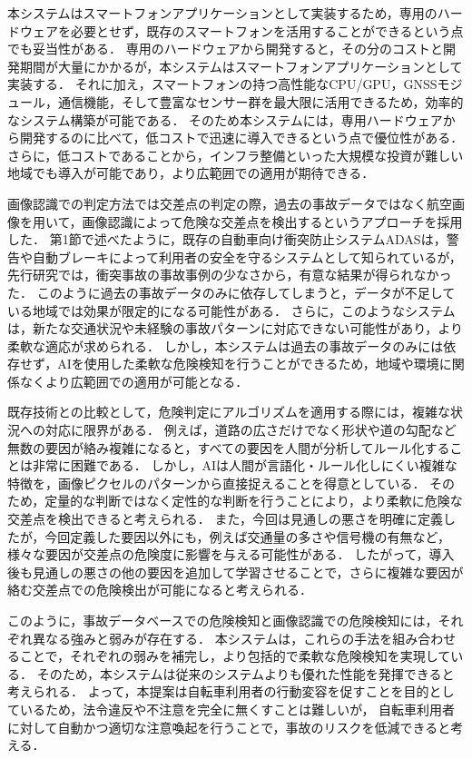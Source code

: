 \documentclass[uplatex,dvipdfmx]{jsarticle}
\begin{document}
本システムはスマートフォンアプリケーションとして実装するため，専用のハードウェアを必要とせず，既存のスマートフォンを活用することができるという点でも妥当性がある．
専用のハードウェアから開発すると，その分のコストと開発期間が大量にかかるが，本システムはスマートフォンアプリケーションとして実装する．
それに加え，スマートフォンの持つ高性能なCPU/GPU，GNSSモジュール，通信機能，そして豊富なセンサー群を最大限に活用できるため，効率的なシステム構築が可能である．
そのため本システムには，専用ハードウェアから開発するのに比べて，低コストで迅速に導入できるという点で優位性がある．
さらに，低コストであることから，インフラ整備といった大規模な投資が難しい地域でも導入が可能であり，より広範囲での適用が期待できる．

画像認識での判定方法では交差点の判定の際，過去の事故データではなく航空画像を用いて，画像認識によって危険な交差点を検出するというアプローチを採用した．
第1節で述べたように，既存の自動車向け衝突防止システムADASは，警告や自動ブレーキによって利用者の安全を守るシステムとして知られているが，
先行研究では，衝突事故の事故事例の少なさから，有意な結果が得られなかった．
このように過去の事故データのみに依存してしまうと，データが不足している地域では効果が限定的になる可能性がある．
さらに，このようなシステムは，新たな交通状況や未経験の事故パターンに対応できない可能性があり，より柔軟な適応が求められる．
しかし，本システムは過去の事故データのみには依存せず，AIを使用した柔軟な危険検知を行うことができるため，地域や環境に関係なくより広範囲での適用が可能となる．

既存技術との比較として，危険判定にアルゴリズムを適用する際には，複雑な状況への対応に限界がある．
例えば，道路の広さだけでなく形状や道の勾配など無数の要因が絡み複雑になると，すべての要因を人間が分析してルール化することは非常に困難である．
しかし，AIは人間が言語化・ルール化しにくい複雑な特徴を，画像ピクセルのパターンから直接捉えることを得意としている．
そのため，定量的な判断ではなく定性的な判断を行うことにより，より柔軟に危険な交差点を検出できると考えられる．
また，今回は見通しの悪さを明確に定義したが，今回定義した要因以外にも，例えば交通量の多さや信号機の有無など，様々な要因が交差点の危険度に影響を与える可能性がある．
したがって，導入後も見通しの悪さの他の要因を追加して学習させることで，さらに複雑な要因が絡む交差点での危険検出が可能になると考えられる．

このように，事故データベースでの危険検知と画像認識での危険検知には，それぞれ異なる強みと弱みが存在する．
本システムは，これらの手法を組み合わせることで，それぞれの弱みを補完し，より包括的で柔軟な危険検知を実現している．
そのため，本システムは従来のシステムよりも優れた性能を発揮できると考えられる．
よって，本提案は自転車利用者の行動変容を促すことを目的としているため，法令違反や不注意を完全に無くすことは難しいが，
自転車利用者に対して自動かつ適切な注意喚起を行うことで，事故のリスクを低減できると考える．
\end{document}

